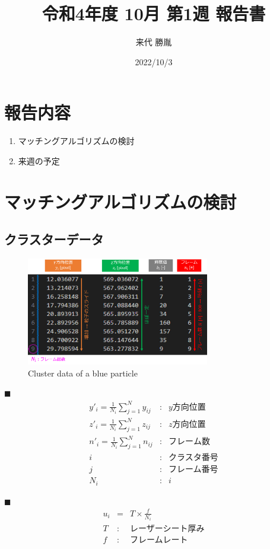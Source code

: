 \documentclass[twocolumn,a4j]{jsarticle}
\author{来代 勝胤}
\title{令和4年度 10月 第1週 報告書}
\date{2022/10/3}
\begin{document}
\columnseprule=0.1mm
\maketitle

\section*{報告内容}
\begin{enumerate}[1.]
  \item マッチングアルゴリズムの検討
  \item 来週の予定
\end{enumerate}

\section{マッチングアルゴリズムの検討}

\subsection{クラスターデータ}
\begin{figure}[htbp]
  \centering
  \includegraphics[width=80mm]{images/cluster_data.png}
  \caption{Cluster data of a blue particle}
\end{figure}

$\blacksquare$\;
\begin{eqnarray*}
  y'_i = \frac{1}{N_i} \sum_{j=1}^{N} y_{ij} &:& y方向位置  \\
  z'_i = \frac{1}{N_i} \sum_{j=1}^{N} z_{ij} &:& z方向位置  \\
  n'_i = \frac{1}{N_i} \sum_{j=1}^{N} n_{ij} &:& フレーム数 \\
  i &:& \text{クラスタ番号}\\
  j &:& \text{フレーム番号}\\
  N_i &:& i
\end{eqnarray*}

$\blacksquare$\;
\begin{eqnarray*}
  u_i &=& T \times \frac{f}{N_i}\\
  T &:& \text{レーザーシート厚み} \\
  f &:& \text{フレームレート}\\
\end{eqnarray*}
\end{document}
